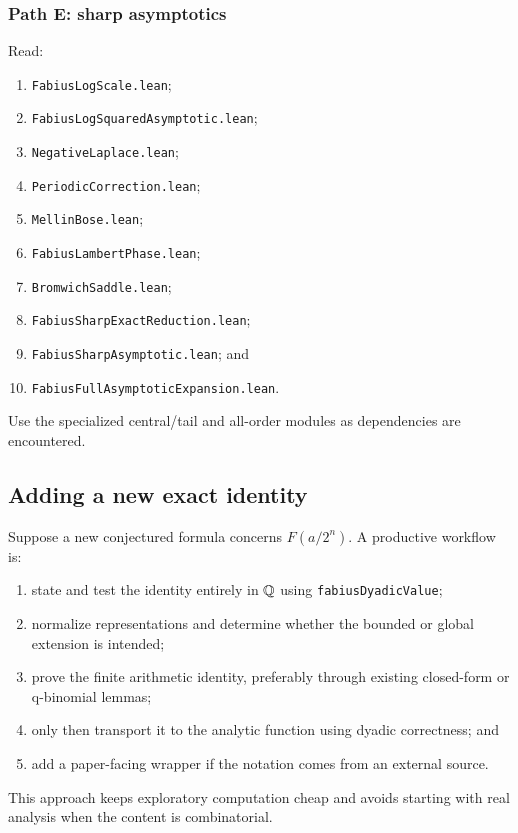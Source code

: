 \documentclass[11pt,oneside]{article}
\theoremstyle{definition}
\theoremstyle{remark}
\begin{document}
\subsubsection{Path E: sharp asymptotics}
Read:
\begin{enumerate}
  \item \nolinkurl{FabiusLogScale.lean};
  \item \nolinkurl{FabiusLogSquaredAsymptotic.lean};
  \item \nolinkurl{NegativeLaplace.lean};
  \item \nolinkurl{PeriodicCorrection.lean};
  \item \nolinkurl{MellinBose.lean};
  \item \nolinkurl{FabiusLambertPhase.lean};
  \item \nolinkurl{BromwichSaddle.lean};
  \item \nolinkurl{FabiusSharpExactReduction.lean};
  \item \nolinkurl{FabiusSharpAsymptotic.lean}; and
  \item \nolinkurl{FabiusFullAsymptoticExpansion.lean}.
\end{enumerate}
Use the specialized central/tail and all-order modules as dependencies are encountered.

\subsection{Adding a new exact identity}
Suppose a new conjectured formula concerns \(F(a/2^n)\).  A productive workflow is:
\begin{enumerate}
  \item state and test the identity entirely in \(\mathbb{Q}\) using \nolinkurl{fabiusDyadicValue};
  \item normalize representations and determine whether the bounded or global extension is intended;
  \item prove the finite arithmetic identity, preferably through existing closed-form or q-binomial lemmas;
  \item only then transport it to the analytic function using dyadic correctness; and
  \item add a paper-facing wrapper if the notation comes from an external source.
\end{enumerate}
This approach keeps exploratory computation cheap and avoids starting with real analysis when the content is combinatorial.
\end{document}
